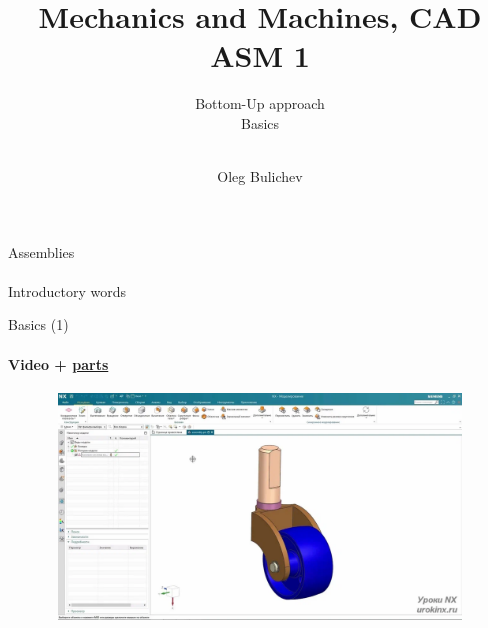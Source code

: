 \documentclass[aspectratio=169]{beamer}
\title[MaM]{Mechanics and Machines, CAD ASM 1} %
\subtitle{Bottom-Up approach
\\ Basics \\ \ 
         } %
\author{Oleg Bulichev}
\newcommand{\fbckg}[1]{\usebackgroundtemplate{\texttt{[image: \#1]}}}%
\begin{document}
\setlength{\abovedisplayskip}{0pt}
\setlength{\belowdisplayskip}{0pt}
\setlength{\abovedisplayshortskip}{0pt}
\setlength{\belowdisplayshortskip}{0pt}

\fbckg{fibeamer/figs/title_page.png}

\fbckg{fibeamer/figs/common.png}

\note{\scriptsize \begin{itemize}
        \item \
    \end{itemize}}

\note{
   \ 
}

\begin{frame}[c]{Assemblies}
\framesubtitle{}
    \centering
    \Huge
    Introductory words
\end{frame}

\begin{frame}[t]{Basics (1)}
    \framesubtitle{Video + \href{https://disk.yandex.ru/d/7ZBj1dYl2SWxjA}{parts}}
    \vspace{-0.6cm}
    \begin{figure}[H]
        \href{https://disk.yandex.ru/i/eTpcseXL44F6jQ}{
            \centering\includegraphics[height=6cm,width=1\textwidth,keepaspectratio]{1.png}}
        \label{fig:1}
    \end{figure}
\end{frame}
\end{document}
